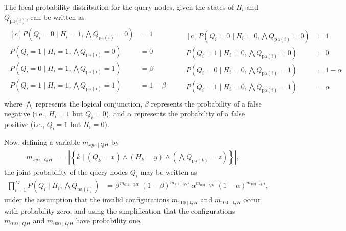 The local probability distribution for the query nodes, given the states of $H_i$ and $Q_{\text{pa}(i)}$, can be written as
\begin{align*}
    \begin{aligned}[c]
        P\left(Q_i = 0 \mid H_i = 1, \bigwedge Q_{\text{pa}(i)} = 0\right) &= 1 \\
        P\left(Q_i = 1 \mid H_i = 1, \bigwedge Q_{\text{pa}(i)} = 0\right) &= 0 \\
        P\left(Q_i = 0 \mid H_i = 1, \bigwedge Q_{\text{pa}(i)} = 1\right) &= \beta \\
        P\left(Q_i = 1 \mid H_i = 1, \bigwedge Q_{\text{pa}(i)} = 1\right) &= 1 - \beta \\
    \end{aligned}
    \qquad
    \begin{aligned}[c]
        P\left(Q_i = 0 \mid H_i = 0, \bigwedge Q_{\text{pa}(i)} = 0\right) &= 1 \\
        P\left(Q_i = 1 \mid H_i = 0, \bigwedge Q_{\text{pa}(i)} = 0\right) &= 0 \\
        P\left(Q_i = 0 \mid H_i = 0, \bigwedge Q_{\text{pa}(i)} = 1\right) &= 1 - \alpha \\
        P\left(Q_i = 1 \mid H_i = 0, \bigwedge Q_{\text{pa}(i)} = 1\right) &= \alpha
    \end{aligned}
\end{align*}
where $\bigwedge$ represents the logical conjunction, $\beta$ represents the probability of a false negative (i.e., $H_i = 1$ but $Q_i = 0$), and $\alpha$ represents the probability of a false positive (i.e., $Q_i = 1$ but $H_i = 0)$.

Now, defining a variable $m_{xyz\mid QH}$ by
\begin{align*}
    m_{xyz\mid QH} 
    &= \left| 
        \left\{k \mid
        \left(
            Q_k = x 
        \right) \wedge  \left(
            H_k = y
        \right) \wedge  \left(
            \bigwedge Q_{\text{pa}(k)} = z
        \right)
        \right\}
    \right|,
\end{align*}
the joint probability of the query nodes $Q_i$ may be written as
\begin{align*}
    \prod_{i=1}^M P\left(Q_i \mid H_i, \bigwedge Q_{\text{pa}(i)}\right)
    &=  \beta^{\,m_{011\mid QH}}
    \;(1 - \beta)^{m_{111\mid QH}}
    \;\alpha^{m_{001\mid QH}}
    \;(1 - \alpha)^{m_{101\mid QH}},
\end{align*}
under the assumption that the invalid configurations $m_{110\mid QH}$ and $m_{100\mid QH}$ occur with probability zero,
and using the simplification that the configurations $m_{010\mid QH}$ and $m_{000\mid QH}$ have probability one.

